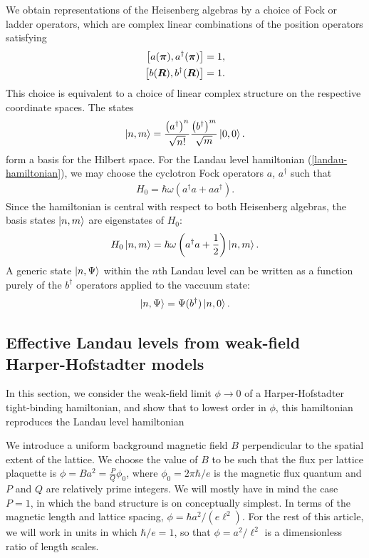\documentclass[aps,prb,twocolumn,letterpaper,twoside,nobalancelastpage,groupedaddress,amsmath,amssymb,floatfix,citeautoscript]{revtex4-1}
\begin{document}
We obtain representations of the Heisenberg algebras by a choice of Fock or ladder operators, which are complex linear combinations of the position operators satisfying
\begin{align*}
\comm{a(\boldsymbol{\pi})}{a^{\dag}(\boldsymbol{\pi})} &= 1, \\
\comm{b(\boldsymbol{R})}{b^{\dag}(\boldsymbol{R})} &= 1.
\end{align*}
This choice is equivalent to a choice of linear complex structure on the respective coordinate spaces. The states 
\begin{align}
\label{basis-state}
\ket{n,m} = \frac{\left(a^{\dag}\right)^n}{\sqrt{n!}}\frac{\left(b^{\dag}\right)^m}{\sqrt{m}} \ket{0,0}.
\end{align}
form a basis for the Hilbert space. For the Landau level hamiltonian (\ref{landau-hamiltonian}), we may choose the cyclotron Fock operators $a$, $a^{\dag}$ such that
\begin{align*}
H_0 = \hbar \omega \left(a^{\dag}a + a a^{\dag}\right).
\end{align*}
Since the hamiltonian is central with respect to both Heisenberg algebras, the basis states $\ket{n,m}$ are eigenstates of $H_0$:
\begin{align*}
H_0 \ket{n,m} = \hbar \omega \left(a^{\dag}a + \frac{1}{2}\right)\ket{n,m}.
\end{align*}
A generic state $\ket{n,\Psi}$ within the $n$th Landau level can be written as a function purely of the $b^{\dag}$ operators applied to the vaccuum state:
\begin{align*}
\ket{n,\Psi} = \Psi(b^{\dag})\ket{n,0}.
\end{align*}

\subsection{Effective Landau levels from weak-field Harper-Hofstadter models}
\label{landau-level-limit}
In this section, we consider the weak-field limit $\phi \rightarrow 0$ of a Harper-Hofstadter tight-binding hamiltonian, and show that to lowest order in $\phi$, this hamiltonian reproduces the Landau level hamiltonian

We introduce a uniform background magnetic field $B$ perpendicular to the spatial extent of the lattice. We choose the value of $B$ to be such that the flux per lattice plaquette is $\phi = Ba^2 = \frac{P}{Q}\phi_0$, where $\phi_0 = 2\pi \hbar /e$ is the magnetic flux quantum and $P$ and $Q$ are relatively prime integers. We will mostly have in mind the case $P =1$, in which the band structure is on conceptually simplest.\cite{Harper:2014vi} In terms of the magnetic length and lattice spacing, $\phi = \hbar a^2/(e \ell^2)$. For the rest of this article, we will work in units in which $\hbar/e= 1$, so that $\phi =a^2/\ell^2$ is a dimensionless ratio of length scales.
\end{document}
